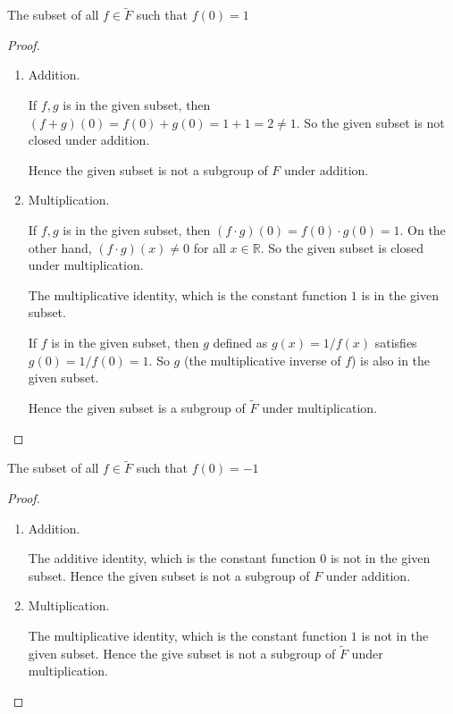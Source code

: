 \newpage
\begin{exercise}
    The subset of all $f\in\tilde{F}$ such that $f(0) = 1$
\end{exercise}

\begin{proof}
    \begin{enumerate}[label={(\alph*)}]
        \item Addition.

              If $f, g$ is in the given subset, then $(f + g)(0) = f(0) + g(0) = 1 + 1 = 2\ne 1$. So the given subset is not closed under addition.

              Hence the given subset is not a subgroup of $F$ under addition.
        \item Multiplication.

              If $f, g$ is in the given subset, then $(f\cdot g)(0) = f(0)\cdot g(0) = 1$. On the other hand, $(f\cdot g)(x) \ne 0$ for all $x\in\mathbb{R}$. So the given subset is closed under multiplication.

              The multiplicative identity, which is the constant function $1$ is in the given subset.

              If $f$ is in the given subset, then $g$ defined as $g(x) = 1/f(x)$ satisfies $g(0) = 1/f(0) = 1$. So $g$ (the multiplicative inverse of $f$) is also in the given subset.

              Hence the given subset is a subgroup of $\tilde{F}$ under multiplication.
    \end{enumerate}
\end{proof}

\newpage
\begin{exercise}
    The subset of all $f\in\tilde{F}$ such that $f(0) = -1$
\end{exercise}

\begin{proof}
    \begin{enumerate}[label={(\alph*)}]
        \item Addition.

              The additive identity, which is the constant function $0$ is not in the given subset. Hence the given subset is not a subgroup of $F$ under addition.
        \item Multiplication.

              The multiplicative identity, which is the constant function $1$ is not in the given subset. Hence the give subset is not a subgroup of $\tilde{F}$ under multiplication.
    \end{enumerate}
\end{proof}

